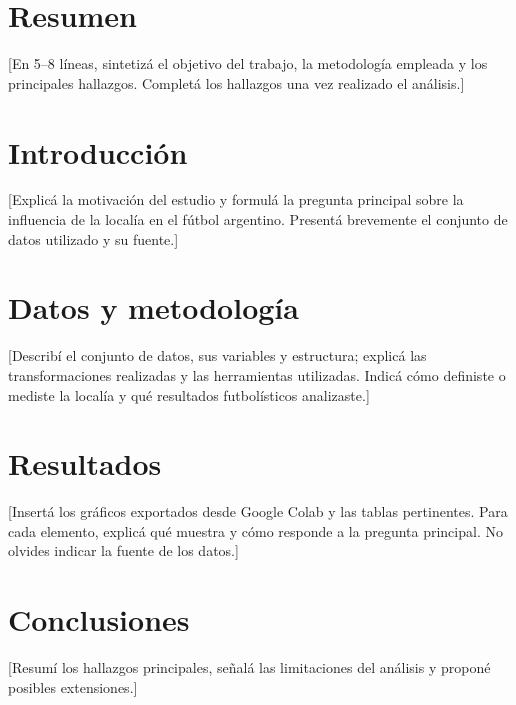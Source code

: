 \documentclass[12pt,a4paper]{article}
\begin{document}
\section{Resumen}
[En 5--8 líneas, sintetizá el objetivo del trabajo, la metodología empleada y los principales hallazgos. Completá los hallazgos una vez realizado el análisis.]

\section{Introducción}
[Explicá la motivación del estudio y formulá la pregunta principal sobre la influencia de la localía en el fútbol argentino. Presentá brevemente el conjunto de datos utilizado y su fuente.]

\section{Datos y metodología}
[Describí el conjunto de datos, sus variables y estructura; explicá las transformaciones realizadas y las herramientas utilizadas. Indicá cómo definiste o mediste la localía y qué resultados futbolísticos analizaste.]

\section{Resultados}
[Insertá los gráficos exportados desde Google Colab y las tablas pertinentes. Para cada elemento, explicá qué muestra y cómo responde a la pregunta principal. No olvides indicar la fuente de los datos.]


\section{Conclusiones}
[Resumí los hallazgos principales, señalá las limitaciones del análisis y proponé posibles extensiones.]

\end{document}
